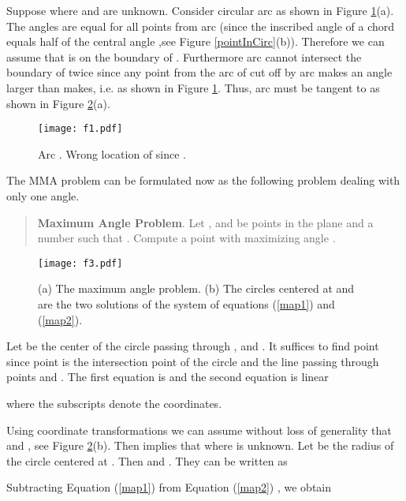 \documentclass[10pt]{article}
\newenvironment{proof}{\begingroup\Proof}{\qed\endgroup}
\def\Proof{\noindent{\bf Proof\/:}\nobreak}
\def\qed{\unskip~{\vrule height 4pt depth 0pt width 4pt}\medbreak}
\begin{document}
\begin{proof}
Suppose  where  and  are unknown.
Consider circular arc  as shown in Figure \ref{f1}(a).
The angles  are equal for all points  from arc  (since the inscribed angle of a chord equals half of the central angle ,see Figure \ref{pointInCirc}(b)). Therefore we can assume that  is on the boundary of . Furthermore arc   cannot intersect the boundary of  twice since any point  from the arc of  cut off by arc  makes an angle larger than  makes, i.e.
 as shown in Figure \ref{f1}. Thus, arc  must be tangent to  as shown in Figure \ref{f3}(a).
\end{proof}

\begin{figure}[htp] 
\centering
\texttt{[image: f1.pdf]}
\caption{Arc . Wrong location of  since .}
\label{f1}
\end{figure}








The MMA problem can be formulated now as the following problem dealing with only one angle.

\begin{quote}
{\bf Maximum Angle Problem}.
Let , and  be points in the plane and a number  such that .
Compute a point  with  maximizing angle
.
\end{quote}

\begin{figure}[htp]
\centering
\texttt{[image: f3.pdf]}
\caption{(a) The maximum angle problem. (b) The circles centered at  and  are the two solutions of the system of equations (\ref{map1}) and (\ref{map2}). }
\label{f3}
\end{figure}

Let  be the center of the circle passing through , and .
It suffices to find point  since point  is the intersection point of the circle  and the line passing through points  and . The first equation is  and the second equation is linear

where the subscripts denote the coordinates.

Using coordinate transformations we can assume without loss of generality that  and , see Figure \ref{f3}(b). Then  implies that  where  is unknown. Let  be the radius of the circle centered at .  
Then  and . They can be written as



Subtracting Equation (\ref{map1}) from Equation (\ref{map2}) , we obtain
\end{document}
